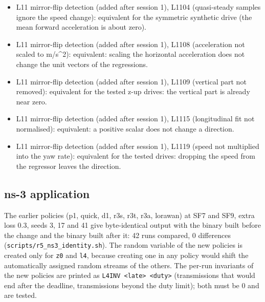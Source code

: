 \begin{itemize}
\item L11 mirror-flip detection (added after session 1), L1104 (quasi-steady samples ignore the speed change): equivalent for the symmetric synthetic drive (the mean forward acceleration is about zero).
\item L11 mirror-flip detection (added after session 1), L1108 (acceleration not scaled to m/s\textasciicircum{}2): equivalent: scaling the horizontal acceleration does not change the unit vectors of the regressions.
\item L11 mirror-flip detection (added after session 1), L1109 (vertical part not removed): equivalent for the tested z-up drives: the vertical part is already near zero.
\item L11 mirror-flip detection (added after session 1), L1115 (longitudinal fit not normalised): equivalent: a positive scalar does not change a direction.
\item L11 mirror-flip detection (added after session 1), L1119 (speed not multiplied into the yaw rate): equivalent for the tested drives: dropping the speed from the regressor leaves the direction.
\end{itemize}

\subsection*{ns-3 application}

The earlier policies (p1, quick, d1, r3s, r3t, r3a, lorawan) at SF7 and SF9, extra loss 0.3, seeds 3, 17 and 41 give byte-identical output with the binary built before the change and the binary built after it: 42 runs compared, 0 differences (\texttt{scripts/r5\_ns3\_identity.sh}). The random variable of the new policies is created only for \texttt{z0} and \texttt{l4}, because creating one in any policy would shift the automatically assigned random streams of the others. The per-run invariants of the new policies are printed as \texttt{L4INV <late> <duty>} (transmissions that would end after the deadline, transmissions beyond the duty limit); both must be 0 and are tested.

